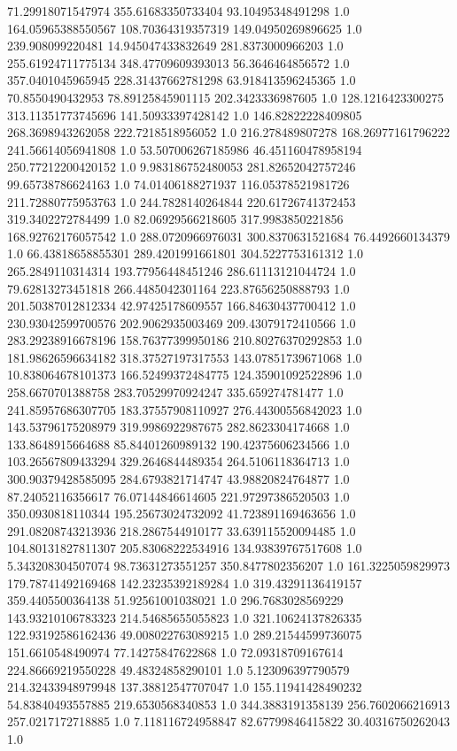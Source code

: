 71.29918071547974	355.61683350733404	93.10495348491298	1.0
164.05965388550567	108.70364319357319	149.04950269896625	1.0
239.908099220481	14.945047433832649	281.8373000966203	1.0
255.61924711775134	348.47709609393013	56.3646464856572	1.0
357.0401045965945	228.31437662781298	63.918413596245365	1.0
70.8550490432953	78.89125845901115	202.3423336987605	1.0
128.1216423300275	313.11351773745696	141.50933397428142	1.0
146.82822228409805	268.3698943262058	222.7218518956052	1.0
216.278489807278	168.26977161796222	241.56614056941808	1.0
53.507006267185986	46.451160478958194	250.77212200420152	1.0
9.983186752480053	281.82652042757246	99.65738786624163	1.0
74.01406188271937	116.05378521981726	211.72880775953763	1.0
244.7828140264844	220.61726741372453	319.3402272784499	1.0
82.06929566218605	317.9983850221856	168.92762176057542	1.0
288.0720966976031	300.8370631521684	76.4492660134379	1.0
66.43818658855301	289.4201991661801	304.5227753161312	1.0
265.2849110314314	193.77956448451246	286.61113121044724	1.0
79.62813273451818	266.4485042301164	223.87656250888793	1.0
201.50387012812334	42.97425178609557	166.84630437700412	1.0
230.93042599700576	202.9062935003469	209.43079172410566	1.0
283.29238916678196	158.76377399950186	210.80276370292853	1.0
181.98626596634182	318.37527197317553	143.07851739671068	1.0
10.838064678101373	166.52499372484775	124.35901092522896	1.0
258.6670701388758	283.70529970924247	335.659274781477	1.0
241.85957686307705	183.37557908110927	276.44300556842023	1.0
143.53796175208979	319.9986922987675	282.8623304174668	1.0
133.8648915664688	85.84401260989132	190.42375606234566	1.0
103.26567809433294	329.2646844489354	264.5106118364713	1.0
300.90379428585095	284.6793821714747	43.98820824764877	1.0
87.24052116356617	76.07144846614605	221.97297386520503	1.0
350.0930818110344	195.25673024732092	41.723891169463656	1.0
291.08208743213936	218.2867544910177	33.639115520094485	1.0
104.80131827811307	205.83068222534916	134.93839767517608	1.0
5.343208304507074	98.73631273551257	350.8477802356207	1.0
161.3225059829973	179.78741492169468	142.23235392189284	1.0
319.43291136419157	359.4405500364138	51.92561001038021	1.0
296.7683028569229	143.93210106783323	214.54685655055823	1.0
321.10624137826335	122.93192586162436	49.008022763089215	1.0
289.21544599736075	151.6610548490974	77.14275847622868	1.0
72.09318709167614	224.86669219550228	49.48324858290101	1.0
5.123096397790579	214.32433948979948	137.38812547707047	1.0
155.11941428490232	54.83840493557885	219.6530568340853	1.0
344.3883191358139	256.7602066216913	257.0217172718885	1.0
7.118116724958847	82.67799846415822	30.40316750262043	1.0
